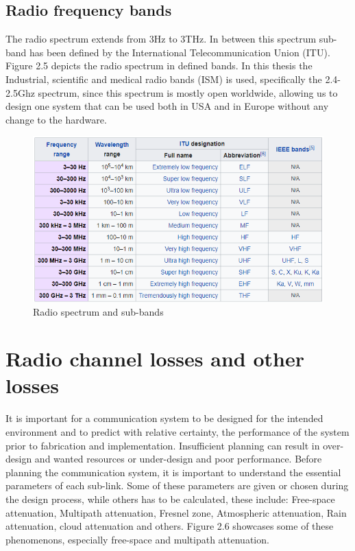 \subsection{Radio frequency bands}
The radio spectrum extends from 3Hz to 3THz. In between this spectrum sub-band has been defined by the International Telecommunication Union (ITU)\cite{ITU}. Figure 2.5 depicts the radio spectrum in defined bands. In this thesis the Industrial, scientific and medical radio bands (ISM)\cite{ISM} is used, specifically the 2.4-2.5Ghz spectrum, since this spectrum is mostly open worldwide, allowing us to design one system that can be used both in USA and in Europe without any change to the hardware.   
\begin{figure}[h]
\centering
\includegraphics[scale=0.8]{figures/radioSpectrum.PNG}
\caption{Radio spectrum and sub-bands\cite{FrequencyBand}}
\end{figure}

\section{Radio channel losses and other losses}
It is important for a communication system to be designed for the intended environment and to predict with relative certainty, the performance of the system prior to fabrication and implementation. Insufficient planning can result in over-design and wanted resources or under-design and poor performance. Before planning the communication system, it is important to understand the essential parameters of each sub-link. Some of these parameters are given or chosen during the design process, while others has to be calculated, these include: Free-space attenuation, Multipath attenuation, Fresnel zone, Atmospheric attenuation, Rain attenuation, cloud attenuation and others. Figure 2.6 showcases some of these phenomenons, especially free-space and multipath attenuation. 

